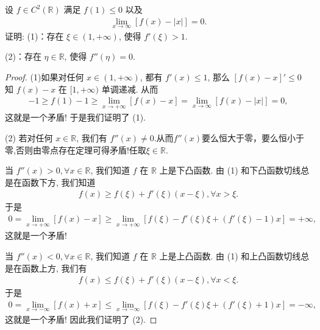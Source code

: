 \documentclass[../../main.tex]{subfiles}
\begin{document}
\begin{example}
设 $f\in C^2(\mathbb{R})$ 满足 $f(1)\leqslant0$ 以及
\begin{align*}
\lim_{x\to\infty}[f(x)-|x|]=0.
\tag{12.27}
\end{align*}
证明:
(1)：存在 $\xi\in(1,+\infty)$, 使得 $f'(\xi)>1$.

(2)：存在 $\eta\in\mathbb{R}$, 使得 $f''(\eta)=0$.
\end{example}
\begin{proof}
(1)如果对任何 $x\in(1,+\infty)$, 都有 $f'(x)\leqslant1$, 那么 $[f(x)-x]'\leqslant0$ 知 $f(x)-x$ 在 $[1,+\infty)$ 单调递减. 从而
\begin{align*}
-1\geqslant f(1)-1\geqslant\lim_{x\to+\infty}[f(x)-x]=\lim_{x\to\infty}[f(x)-|x|]=0,
\end{align*}
这就是一个矛盾! 于是我们证明了 (1).

(2)
若对任何 $x\in\mathbb{R}$, 我们有 $f''(x)\neq0$.从而$f''(x)$要么恒大于零，要么恒小于零,否则由零点存在定理可得矛盾!任取$\xi \in \mathbb{R}$.

当 $f''(x)>0,\forall x\in\mathbb{R}$, 我们知道 $f$ 在 $\mathbb{R}$ 上是下凸函数. 由 (1) 和下凸函数切线总是在函数下方, 我们知道
\begin{align*}
f(x)\geqslant f(\xi)+f'(\xi)(x-\xi),\forall x>\xi.
\end{align*}
于是
\begin{align*}
0=\lim_{x\to+\infty}[f(x)-x]\geqslant\lim_{x\to+\infty}[f(\xi)-f'(\xi)\xi+(f'(\xi)-1)x]=+\infty,
\end{align*}
这就是一个矛盾!

当 $f''(x)<0,\forall x\in\mathbb{R}$, 我们知道 $f$ 在 $\mathbb{R}$ 上是上凸函数. 由 (1) 和上凸函数切线总是在函数上方, 我们有
\begin{align*}
f(x)\leqslant f(\xi)+f'(\xi)(x-\xi),\forall x<\xi.
\end{align*}
于是
\begin{align*}
0=\lim_{x\to-\infty}[f(x)+x]\leqslant\lim_{x\to-\infty}[f(\xi)-f'(\xi)\xi+(f'(\xi)+1)x]=-\infty,
\end{align*}
这就是一个矛盾! 因此我们证明了 (2). 

\end{proof}
\end{document}
